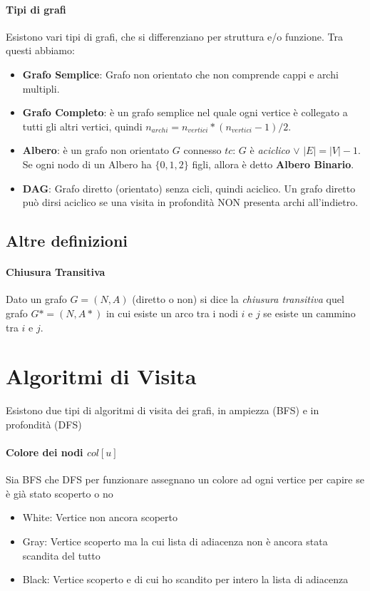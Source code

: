 \documentclass[12pt, a4paper, openany]{book}
\begin{document}
\paragraph{Tipi di grafi} Esistono vari tipi di grafi, che si differenziano per struttura e/o funzione.
Tra questi abbiamo:
\begin{itemize}
	\item \textbf{Grafo Semplice}: Grafo non orientato che non comprende cappi e archi multipli.
	\item \textbf{Grafo Completo}: è un grafo semplice nel quale ogni vertice è collegato a tutti gli altri vertici, quindi $n_{archi} = n_{vertici} * (n_{vertici} - 1)/2$.
	\item \textbf{Albero}: è un grafo non orientato $G$ connesso $tc$: $G$ è \emph{aciclico} $\vee$ $|E| = |V| - 1$.
			\\Se ogni nodo di un Albero ha  $\{0,1,2\}$ figli, allora è detto \textbf{Albero Binario}.
	\item \textbf{DAG}: Grafo diretto (orientato) senza cicli, quindi aciclico.
			Un grafo diretto può dirsi aciclico se una visita in profondità NON presenta archi all'indietro.
\end{itemize}

\subsection*{Altre definizioni}
\paragraph{Chiusura Transitiva}
Dato un grafo $G=(N,A)$ (diretto o non) si dice la \emph{chiusura transitiva} quel grafo $G*=(N,A*)$ in cui esiste un arco tra i nodi $i$ e $j$ se esiste un cammino tra $i$ e $j$.
\section{Algoritmi di Visita}
Esistono due tipi di algoritmi di visita dei grafi, in ampiezza (BFS) e in profondità (DFS)

\paragraph{Colore dei nodi $col[u]$}
Sia BFS che DFS per funzionare assegnano un colore ad ogni vertice per capire se è già stato scoperto o no
\begin{itemize}
	\item White: Vertice non ancora scoperto
	\item Gray: Vertice scoperto ma la cui lista di adiacenza non è ancora stata scandita del tutto
	\item Black: Vertice scoperto e di cui ho scandito per intero la lista di adiacenza
\end{itemize}
\end{document}
